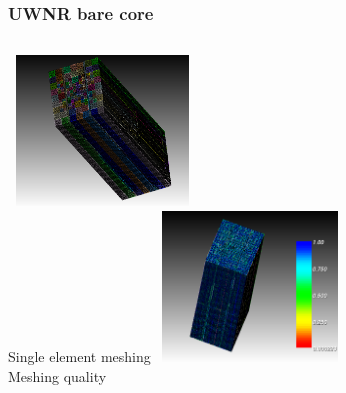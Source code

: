 \documentclass[fleqn]{beamer}
\begin{document}
 \begin{frame}
 \frametitle{UWNR bare core}
 \begin{columns}[t]
 \centering
 \includegraphics[width=5cm,height=4cm]{figures/bare_core_mesh.png}\\{Single element meshing}
 \centering
 \includegraphics[width=5cm,height=4cm]{figures/bare_core_mesh_quality.png}\\{Meshing quality}
 \end{columns}
 \end{frame}
\end{document}
